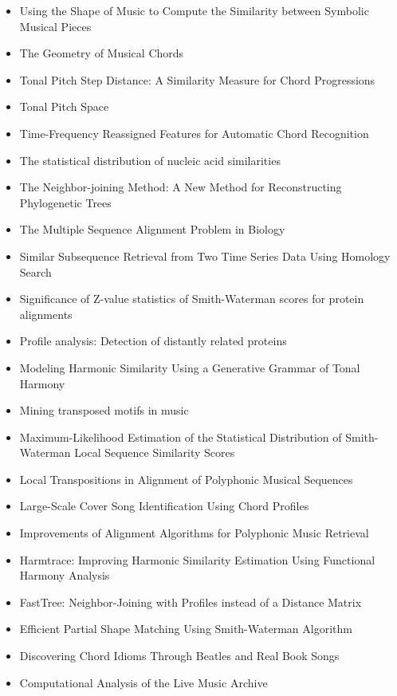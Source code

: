 \begin{itemize}
\item Using the Shape of Music to Compute the Similarity between Symbolic Musical Pieces \cite{urbano2010using}
\item The Geometry of Musical Chords \cite{Tymoczko_2006}
\item Tonal Pitch Step Distance: A Similarity Measure for Chord Progressions \cite{de2008tonal}
\item Tonal Pitch Space \cite{lerdahl1988tonal}
\item Time-Frequency Reassigned Features for Automatic Chord Recognition \cite{khadkevich2011time}
\item The statistical distribution of nucleic acid similarities \cite{smith1985statistical}
\item The Neighbor-joining Method: A New Method for Reconstructing Phylogenetic Trees \cite{saitou1987neighbor}
\item The Multiple Sequence Alignment Problem in Biology \cite{carrillo1988multiple}
\item Similar Subsequence Retrieval from Two Time Series Data Using Homology Search \cite{nishii2010similar}
\item Significance of Z-value statistics of Smith-Waterman scores for protein alignments \cite{comet1999significance}
\item Profile analysis: Detection of distantly related proteins \cite{gribskov1987profile}
\item Modeling Harmonic Similarity Using a Generative Grammar of Tonal Harmony \cite{de2009modeling}
\item Mining transposed motifs in music \cite{jimenez2011mining}
\item Maximum-Likelihood Estimation of the Statistical Distribution of Smith-Waterman Local Sequence Similarity Scores \cite{mott1992maximum}
\item Local Transpositions in Alignment of Polyphonic Musical Sequences \cite{allali2007local}
\item Large-Scale Cover Song Identification Using Chord Profiles \cite{khadkevich2013large}
\item Improvements of Alignment Algorithms for Polyphonic Music Retrieval \cite{hanna2008improvements}
\item Harmtrace: Improving Harmonic Similarity Estimation Using Functional Harmony Analysis \cite{de2011harmtrace}
\item FastTree: Neighbor-Joining with Profiles instead of a Distance Matrix \cite{price2009fasttree}
\item Efficient Partial Shape Matching Using Smith-Waterman Algorithm \cite{liu2012shape}
\item Discovering Chord Idioms Through Beatles and Real Book Songs \cite{mauch:dci}
\item Computational Analysis of the Live Music Archive \cite{bechhofer2014computational}
\end{itemize}